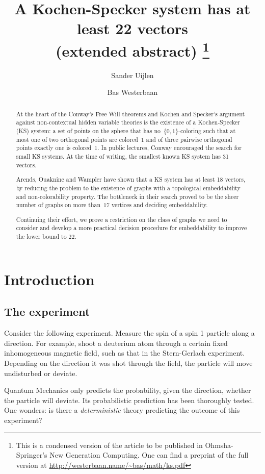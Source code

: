 \documentclass[adraft,copyright,creativecommons]{eptcs}
\title{A Kochen-Specker system has at least 22 vectors\\
        {\small (extended abstract)%
            \footnote{This is a condensed version of the article
                        to be published in Ohmsha-Springer's
                        New Generation Computing.
                    One can find a preprint of the full version at
                    \url{http://westerbaan.name/\~bas/math/ks.pdf}}}}
\author{Sander Uijlen
    \institute{Radboud Universiteit}
    \email{suijlen@cs.ru.nl}
\and
    Bas Westerbaan
    \institute{Radboud Universiteit}
    \email{bwesterb@cs.ru.nl}}
\theoremstyle{definition}
\theoremstyle{remark}
\begin{document}
\maketitle

\begin{abstract}
    At the heart of the Conway's Free Will theorems and Kochen and Specker's
        argument against non-contextual hidden variable theories
    is the existence of a Kochen-Specker (KS) system:
    a set of points on the sphere
    that has no~$\{0,1\}$-coloring such that
    at most one of two orthogonal points are colored~$1$
    and of three pairwise orthogonal points exactly one
    is colored~$1$.
    In public lectures, Conway encouraged the search for small
    KS systems.
    At the time of writing, the smallest known
    KS system has 31 vectors.  

    Arends, Ouaknine and Wampler have shown that a KS system has at least
    18 vectors, by reducing the problem to the existence of graphs
    with a topological embeddability and non-colorability property.
    The bottleneck in their search
    proved to be the sheer number of graphs on more than~$17$
    vertices and deciding embeddability.

    Continuing their effort, we prove a restriction on the class of graphs
    we need to consider and develop a more practical decision procedure for
    embeddability to improve the lower bound to 22.
\end{abstract}

\clearpage
    
\section{Introduction}

\subsection{The experiment}

Consider the following experiment. Measure the spin of a spin 1
particle along a direction. For example, shoot a deuterium
atom through a certain fixed inhomogeneous magnetic field,
such as that in the Stern-Gerlach experiment. Depending
on the direction it was shot through the field, the particle will
move undisturbed or deviate.

Quantum Mechanics only predicts the probability, given the direction,
whether the particle will deviate.
Its probabilistic prediction has been thoroughly tested.
One wonders: is there a
\emph{deterministic} theory predicting the
outcome of this experiment?
\end{document}
